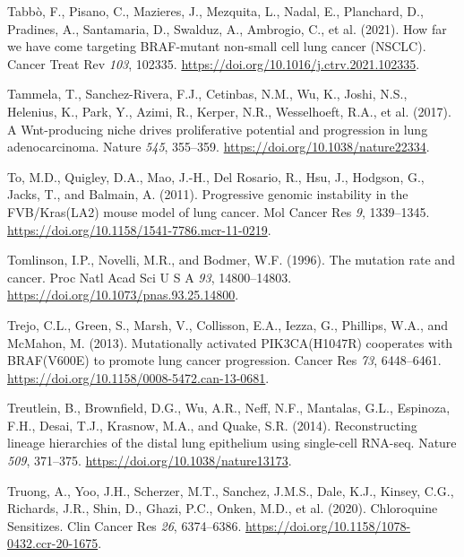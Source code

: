 \begin{CSLReferences}{0}{0}
\leavevmode{}%
Tabbò, F., Pisano, C., Mazieres, J., Mezquita, L., Nadal, E., Planchard, D., Pradines, A., Santamaria, D., Swalduz, A., Ambrogio, C., et al. (2021). How far we have come targeting BRAF-mutant non-small cell lung cancer (NSCLC). Cancer Treat Rev \emph{103}, 102335. \url{https://doi.org/10.1016/j.ctrv.2021.102335}.

\leavevmode{}%
Tammela, T., Sanchez-Rivera, F.J., Cetinbas, N.M., Wu, K., Joshi, N.S., Helenius, K., Park, Y., Azimi, R., Kerper, N.R., Wesselhoeft, R.A., et al. (2017). A Wnt-producing niche drives proliferative potential and progression in lung adenocarcinoma. Nature \emph{545}, 355--359. \url{https://doi.org/10.1038/nature22334}.

\leavevmode{}%
To, M.D., Quigley, D.A., Mao, J.-H., Del Rosario, R., Hsu, J., Hodgson, G., Jacks, T., and Balmain, A. (2011). Progressive genomic instability in the FVB/Kras(LA2) mouse model of lung cancer. Mol Cancer Res \emph{9}, 1339--1345. \url{https://doi.org/10.1158/1541-7786.mcr-11-0219}.

\leavevmode{}%
Tomlinson, I.P., Novelli, M.R., and Bodmer, W.F. (1996). The mutation rate and cancer. Proc Natl Acad Sci U S A \emph{93}, 14800--14803. \url{https://doi.org/10.1073/pnas.93.25.14800}.

\leavevmode{}%
Trejo, C.L., Green, S., Marsh, V., Collisson, E.A., Iezza, G., Phillips, W.A., and McMahon, M. (2013). Mutationally activated PIK3CA(H1047R) cooperates with BRAF(V600E) to promote lung cancer progression. Cancer Res \emph{73}, 6448--6461. \url{https://doi.org/10.1158/0008-5472.can-13-0681}.

\leavevmode{}%
Treutlein, B., Brownfield, D.G., Wu, A.R., Neff, N.F., Mantalas, G.L., Espinoza, F.H., Desai, T.J., Krasnow, M.A., and Quake, S.R. (2014). Reconstructing lineage hierarchies of the distal lung epithelium using single-cell RNA-seq. Nature \emph{509}, 371--375. \url{https://doi.org/10.1038/nature13173}.

\leavevmode{}%
Truong, A., Yoo, J.H., Scherzer, M.T., Sanchez, J.M.S., Dale, K.J., Kinsey, C.G., Richards, J.R., Shin, D., Ghazi, P.C., Onken, M.D., et al. (2020). Chloroquine Sensitizes. Clin Cancer Res \emph{26}, 6374--6386. \url{https://doi.org/10.1158/1078-0432.ccr-20-1675}.


\end{CSLReferences}
